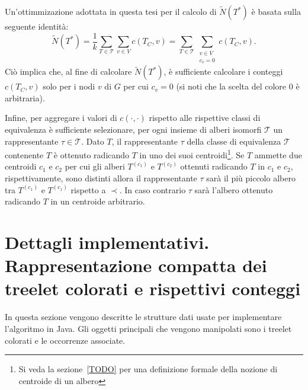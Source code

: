 


Un'ottimmizazione adottata in questa tesi per il calcolo di $\widetilde{N}(T^*)$ è basata sulla seguente identità:
\[
\widetilde{N}(T^*) = \frac{1}{k}\sum_{T \in \mathcal{T}} \sum_{v \in V} c( T_C, v)
=
\sum_{T \in \mathcal{T}} \sum_{\substack{v \in V \\ c_v = 0}} c( T_C, v).
\]
Ciò implica che, al fine di calcolare $\widetilde{N}(T^*)$, è sufficiente calcolare i conteggi $ c(T_C,v) $ solo per i nodi $v$ di $G$ per cui $ c_v = 0 $ (si noti che la scelta del colore $0$ è arbitraria).


Infine, per aggregare i valori di $c(\cdot, \cdot)$
rispetto alle rispettive classi di equivalenza è sufficiente
selezionare, per ogni insieme di alberi isomorfi $\mathcal{T}$ un rappresentante $\tau \in \mathcal{T}$.
Dato $T$, il rappresentante $\tau$ della classe di equivalenza $\mathcal{T}$ contenente $T$ è ottenuto radicando $T$ in uno dei suoi centroidi\footnote{Si veda la sezione~\ref{TODO} per una definizione formale della nozione di centroide di un albero}.
Se $T$ ammette due centroidi $c_1$ e $c_2$ per cui
gli alberi
$T^{(c_1)}$ e $T^{(c_2)}$  ottenuti radicando $T$ in $c_1$ e $c_2$, rispettivamente, sono distinti allora il rappresentante $\tau$ sarà il più piccolo albero tra $T^{(c_1)}$ e $T^{(c_1)}$ rispetto a $\prec$.
In caso contrario $\tau$ sarà l'albero ottenuto radicando $T$ in un centroide arbitrario.





\section{Dettagli implementativi. Rappresentazione compatta dei treelet colorati e rispettivi conteggi}
\label{section 2}
In questa sezione vengono descritte le strutture dati usate per implementare l'algoritmo in Java.
Gli oggetti principali che vengono manipolati sono i treelet colorati e le occorrenze associate.

